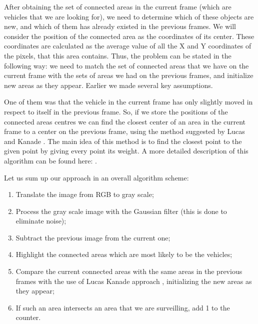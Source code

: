 \documentclass[12pt,a4paper,oneside,titlepage]{article}
\begin{document}
After obtaining the set of connected areas in the current frame (which are vehicles that we are looking for), we need to determine which of these objects are new, and which of them has already existed in the previous frames.
We will consider the position of the connected area as the coordinates of its center.
These coordinates are calculated as the average value of all the X and Y coordinates of the pixels, that this area contains.
Thus, the problem can be stated in the following way: we need to match the set of connected areas that we have on the current frame with the sets of areas we had on the previous frames, and initialize new areas as they appear.
Earlier we made several key assumptions.

One of them was that the vehicle in the current frame has only slightly moved in respect to itself in the previous frame.
So, if we store the positions of the connected areas centres we can find the closest center of an area in the current frame to a center on the previous frame, using the method suggested by Lucas and Kanade \cite{lucaskanade}.
The main idea of this method is to find the closest point to the given point by giving every point its weight.
A more detailed description of this algorithm can be found here: \cite{lucaskanade}.


Let us sum up our approach in an overall algorithm scheme:
\begin{enumerate}
	\item Translate the image from RGB to gray scale;
	\item Process the gray scale image with the Gaussian filter (this is done to eliminate noise);
	\item Subtract the previous image from the current one;
	\item Highlight the connected areas which are most likely to be the vehicles;
	\item Compare the current connected areas with the same areas in the previous frames with the use of Lucas Kanade approach \cite{lucaskanade}, initializing the new areas as they appear;
	\item If such an area intersects an area that we are surveilling, add 1 to the counter.
\end{enumerate}













\newpage
\end{document}
